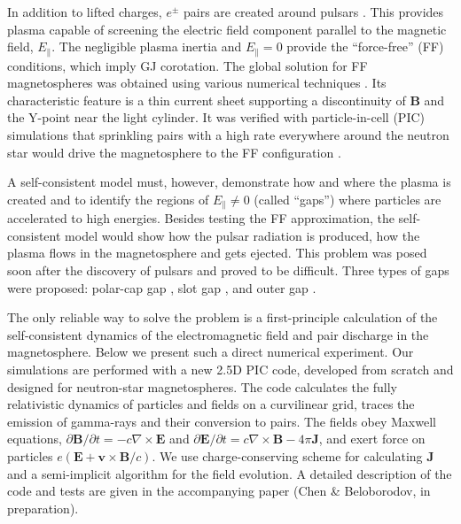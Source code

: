 In addition to lifted charges, $e^\pm$ pairs are created around pulsars
\citep{sturrock_model_1971}.
This provides plasma capable of
screening the electric field component parallel to the magnetic field, $E_\parallel$.
The negligible plasma inertia and $E_\parallel=0$ provide the ``force-free'' (FF)
conditions, which imply GJ corotation.
The global solution for FF magnetospheres was obtained
using various numerical techniques
\citep{contopoulos_axisymmetric_1999,timokhin_force-free_2006,spitkovsky_time-dependent_2006,kalapotharakos_three-dimensional_2009,parfrey_introducing_2012}.
Its characteristic feature is a thin current sheet supporting
a discontinuity of $\mathbf{B}$ and the Y-point near the light cylinder.
It was verified with particle-in-cell (PIC) simulations that
sprinkling pairs with a high rate everywhere around the neutron star
would drive the magnetosphere to the FF configuration \citep{philippov_ab_2014}.

A self-consistent model must, however, demonstrate how and where the plasma is
created and to identify the regions of $E_\parallel\neq 0$ (called ``gaps'')
where particles are accelerated to high energies. Besides testing the FF
approximation, the self-consistent model would show how the pulsar
radiation is produced, how the plasma flows in the magnetosphere and gets ejected.
This problem was posed soon after the discovery of pulsars and proved to be difficult.
Three types of gaps were proposed: polar-cap gap
\citep{sturrock_model_1971,ruderman_theory_1975}, slot gap
\citep{arons_pair_1983,2004ApJ...606.1143M},
and outer gap
\citep{cheng_energetic_1986}.

The only reliable way to solve the problem is a first-principle calculation of the
self-consistent dynamics of the electromagnetic field and pair discharge in the
magnetosphere. Below we present such a direct numerical experiment.
Our simulations are performed with a new 2.5D PIC code, developed from
scratch and designed for neutron-star magnetospheres.
The code calculates the fully relativistic dynamics of particles and fields
on a curvilinear grid, traces the emission of gamma-rays and their conversion to pairs.
The fields obey Maxwell equations, $\partial\mathbf{B}/\partial t=-c\nabla\times\mathbf{E}$ and
$\partial\mathbf{E}/\partial t=c\nabla\times\mathbf{B} - 4\pi\mathbf{J}$, and exert force on particles
$e(\mathbf{E}+\mathbf{v}\times\mathbf{B}/c)$. We use
\citet{esirkepov_2001}
charge-conserving scheme for calculating $\mathbf{J}$
and a semi-implicit algorithm for the field evolution.
A detailed description of the code and tests are given in the accompanying paper
(Chen \& Beloborodov, in preparation).


